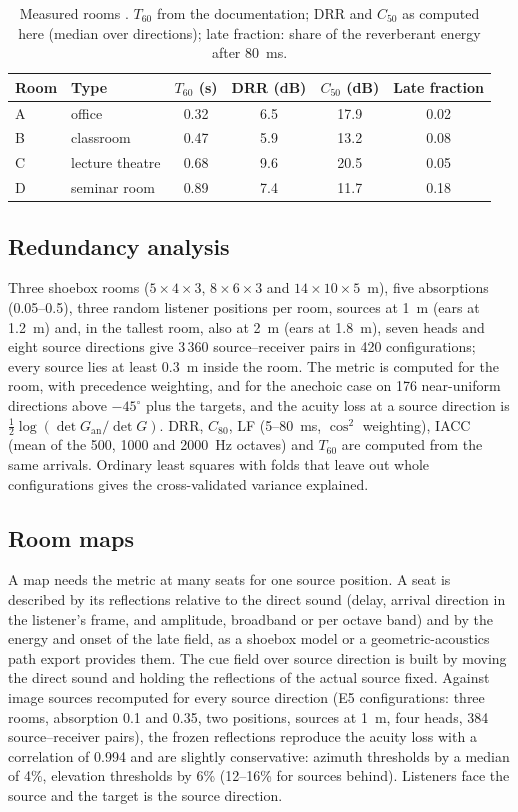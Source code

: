 \documentclass[11pt]{article}
\begin{document}
\begin{table}[!tbp]
\centering
\caption{Measured rooms \citep{hummersone2010}. $T_{60}$ from the documentation; DRR and $C_{50}$ as computed here (median over directions); late fraction: share of the reverberant energy after 80~ms.}
\label{tab:rooms}
\small
\begin{tabular}{llcccc}
\toprule
Room & Type & $T_{60}$ (s) & DRR (dB) & $C_{50}$ (dB) & Late fraction\\
\midrule
A & office & 0.32 & 6.5 & 17.9 & 0.02\\
B & classroom & 0.47 & 5.9 & 13.2 & 0.08\\
C & lecture theatre & 0.68 & 9.6 & 20.5 & 0.05\\
D & seminar room & 0.89 & 7.4 & 11.7 & 0.18\\
\bottomrule
\end{tabular}
\end{table}

\subsection{Redundancy analysis}
Three shoebox rooms ($5\times4\times3$, $8\times6\times3$ and $14\times10\times5$~m), five absorptions (0.05--0.5), three random listener positions per room, sources at 1~m (ears at 1.2~m) and, in the tallest room, also at 2~m (ears at 1.8~m), seven heads and eight source directions give 3\,360 source--receiver pairs in 420 configurations; every source lies at least 0.3~m inside the room. The metric is computed for the room, with precedence weighting, and for the anechoic case on 176 near-uniform directions above $-45^\circ$ plus the targets, and the acuity loss at a source direction is $\tfrac12\log(\det G_{\mathrm{an}}/\det G)$. DRR, $C_{80}$, LF (5--80~ms, $\cos^2$ weighting), IACC (mean of the 500, 1000 and 2000~Hz octaves) and $T_{60}$ are computed from the same arrivals. Ordinary least squares with folds that leave out whole configurations gives the cross-validated variance explained.

\subsection{Room maps}
A map needs the metric at many seats for one source position. A seat is described by its reflections relative to the direct sound (delay, arrival direction in the listener's frame, and amplitude, broadband or per octave band) and by the energy and onset of the late field, as a shoebox model or a geometric-acoustics path export provides them. The cue field over source direction is built by moving the direct sound and holding the reflections of the actual source fixed. Against image sources recomputed for every source direction (E5 configurations: three rooms, absorption 0.1 and 0.35, two positions, sources at 1~m, four heads, 384 source--receiver pairs), the frozen reflections reproduce the acuity loss with a correlation of 0.994 and are slightly conservative: azimuth thresholds by a median of 4\%, elevation thresholds by 6\% (12--16\% for sources behind). Listeners face the source and the target is the source direction.
\end{document}

